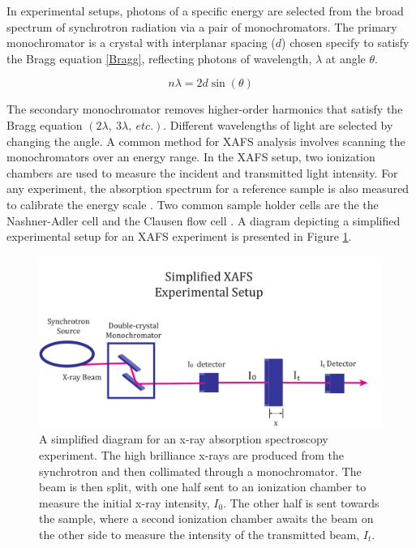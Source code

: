 In experimental setups, photons of a specific energy are selected from the broad spectrum of synchrotron radiation via a pair of monochromators. The primary monochromator is a crystal with interplanar spacing ($ d $) chosen specify to satisfy the Bragg equation \ref{Bragg}, reflecting photons of wavelength, $ \lambda $ at angle $ \theta $.  

\begin{equation}
    \label{Bragg}
    n\lambda = 2d\sin(\theta)
\end{equation}

The secondary monochromator removes higher-order harmonics that satisfy the Bragg equation $ (2\lambda,~3\lambda,~etc.). $ Different wavelengths of light are selected by changing the angle. A common method for XAFS analysis involves scanning the monochromators over an energy range. In the XAFS setup, two ionization chambers are used to measure the incident and transmitted light intensity. For any experiment, the absorption spectrum for a reference sample is also measured to calibrate the energy scale \cite{exafsxanes1988}. Two common sample holder cells are the the Nashner-Adler cell and the Clausen flow cell \cite{nicks-thesis}. A diagram depicting a simplified experimental setup for an XAFS experiment is presented in Figure \ref{fig:xafs-setup}.  

\begin{figure}[h]
    \centering
    \includegraphics[width=\linewidth]{Chapters/Figures/synchrotron-diagram.pdf}
    \caption[Example XAFS Experiment Setup]{A simplified diagram for an x-ray absorption spectroscopy experiment. The high brilliance x-rays are produced from the synchrotron and then collimated through a monochromator. The beam is then split, with one half sent to an ionization chamber to measure the initial x-ray intensity, $ I_0 $. The other half is sent towards the sample, where a second ionization chamber awaits the beam on the other side to measure the intensity of the transmitted beam, $ I_t $.}
    \label{fig:xafs-setup}
\end{figure}

